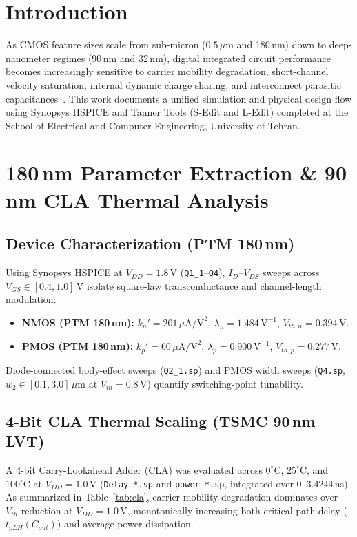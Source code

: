 \documentclass[conference]{IEEEtran}
\begin{document}
\section{Introduction}
As CMOS feature sizes scale from sub-micron ($0.5\,\mu\text{m}$ and 180\,nm) down to deep-nanometer regimes (90\,nm and 32\,nm), digital integrated circuit performance becomes increasingly sensitive to carrier mobility degradation, short-channel velocity saturation, internal dynamic charge sharing, and interconnect parasitic capacitances~\cite{rabaey}. This work documents a unified simulation and physical design flow using Synopsys HSPICE and Tanner Tools (S-Edit and L-Edit) completed at the School of Electrical and Computer Engineering, University of Tehran.

\section{180\,nm Parameter Extraction \& 90\,nm CLA Thermal Analysis}
\subsection{Device Characterization (PTM 180\,nm)}
Using Synopsys HSPICE at $V_{DD} = 1.8\,\text{V}$ (\texttt{Q1\_1}--\texttt{Q4}), $I_D$--$V_{DS}$ sweeps across $V_{GS} \in [0.4, 1.0]\,\text{V}$ isolate square-law transconductance and channel-length modulation:
\begin{itemize}
    \item \textbf{NMOS (PTM 180\,nm):} $k_n' = 201\,\mu\text{A/V}^2$, $\lambda_n = 1.484\,\text{V}^{-1}$, $V_{th,n} = 0.394\,\text{V}$.
    \item \textbf{PMOS (PTM 180\,nm):} $k_p' = 60\,\mu\text{A/V}^2$, $\lambda_p = 0.900\,\text{V}^{-1}$, $V_{th,p} = 0.277\,\text{V}$.
\end{itemize}
Diode-connected body-effect sweeps (\texttt{Q2\_1.sp}) and PMOS width sweeps (\texttt{Q4.sp}, $w_2 \in [0.1, 3.0]\,\mu\text{m}$ at $V_{in} = 0.8\,\text{V}$) quantify switching-point tunability.

\subsection{4-Bit CLA Thermal Scaling (TSMC 90\,nm LVT)}
A 4-bit Carry-Lookahead Adder (CLA) was evaluated across $0^\circ\text{C}$, $25^\circ\text{C}$, and $100^\circ\text{C}$ at $V_{DD} = 1.0\,\text{V}$ (\texttt{Delay\_*.sp} and \texttt{power\_*.sp}, integrated over $0$--$3.4244\,\text{ns}$). As summarized in Table~\ref{tab:cla}, carrier mobility degradation dominates over $V_{th}$ reduction at $V_{DD} = 1.0\,\text{V}$, monotonically increasing both critical path delay ($t_{pLH}(C_{out})$) and average power dissipation.
\end{document}
